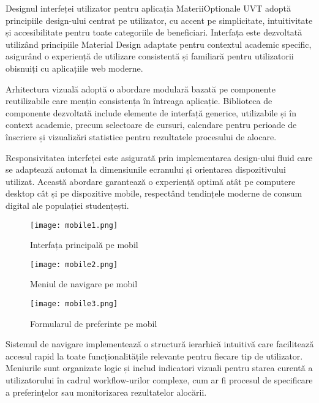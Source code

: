 \documentclass[12pt,a4paper]{report}
\begin{document}
Designul interfeței utilizator pentru aplicația MateriiOptionale UVT adoptă principiile design-ului centrat pe utilizator, cu accent pe simplicitate, intuitivitate și accesibilitate pentru toate categoriile de beneficiari. Interfața este dezvoltată utilizând principiile Material Design adaptate pentru contextul academic specific, asigurând o experiență de utilizare consistentă și familiară pentru utilizatorii obisnuiți cu aplicațiile web moderne.

Arhitectura vizuală adoptă o abordare modulară bazată pe componente reutilizabile care mențin consistența în întreaga aplicație. Biblioteca de componente dezvoltată include elemente de interfață generice, utilizabile și în context academic, precum selectoare de cursuri, calendare pentru perioade de înscriere și vizualizări statistice pentru rezultatele procesului de alocare.

Responsivitatea interfeței este asigurată prin implementarea design-ului fluid \cite{responsive-design} care se adaptează automat la dimensiunile ecranului și orientarea dispozitivului utilizat. Această abordare garantează o experiență optimă atât pe computere desktop cât și pe dispozitive mobile, respectând tendințele moderne de consum digital ale populației studențești.

\begin{figure}[H]
\centering
\begin{minipage}{0.3\textwidth}
\centering
\texttt{[image: mobile1.png]}
\caption{Interfața principală pe mobil}
\label{fig:mobile1}
\end{minipage}
\hfill
\begin{minipage}{0.3\textwidth}
\centering
\texttt{[image: mobile2.png]}
\caption{Meniul de navigare pe mobil}
\label{fig:mobile2}
\end{minipage}
\hfill
\begin{minipage}{0.3\textwidth}
\centering
\texttt{[image: mobile3.png]}
\caption{Formularul de preferințe pe mobil}
\label{fig:mobile3}
\end{minipage}
\end{figure}

Sistemul de navigare implementează o structură ierarhică intuitivă care facilitează accesul rapid la toate funcționalitățile relevante pentru fiecare tip de utilizator. Meniurile sunt organizate logic și includ indicatori vizuali pentru starea curentă a utilizatorului în cadrul workflow-urilor complexe, cum ar fi procesul de specificare a preferințelor sau monitorizarea rezultatelor alocării.
\end{document}
